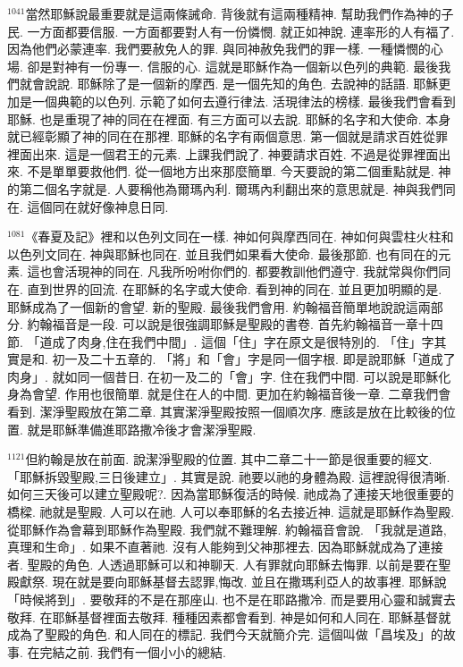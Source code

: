 \documentclass{book}
\begin{document}
$^{1041}$當然耶穌說最重要就是這兩條誡命.
背後就有這兩種精神.
幫助我們作為神的子民.
一方面都要信服.
一方面都要對人有一份憐憫.
就正如神說.
連率形的人有福了.
因為他們必蒙連率.
我們要赦免人的罪.
與同神赦免我們的罪一樣.
一種憐憫的心場.
卻是對神有一份專一.
信服的心.
這就是耶穌作為一個新以色列的典範.
最後我們就會說說.
耶穌除了是一個新的摩西.
是一個先知的角色.
去說神的話語.
耶穌更加是一個典範的以色列.
示範了如何去遵行律法.
活現律法的榜樣.
最後我們會看到耶穌.
也是重現了神的同在在裡面.
有三方面可以去說.
耶穌的名字和大使命.
本身就已經彰顯了神的同在在那裡.
耶穌的名字有兩個意思.
第一個就是請求百姓從罪裡面出來.
這是一個君王的元素.
上課我們說了.
神要請求百姓.
不過是從罪裡面出來.
不是單單要救他們.
從一個地方出來那麼簡單.
今天要說的第二個重點就是.
神的第二個名字就是.
人要稱他為爾瑪內利.
爾瑪內利翻出來的意思就是.
神與我們同在.
這個同在就好像神息日同.

$^{1081}$《春夏及記》裡和以色列文同在一樣.
神如何與摩西同在.
神如何與雲柱火柱和以色列文同在.
神與耶穌也同在.
並且我們如果看大使命.
最後那節.
也有同在的元素.
這也會活現神的同在.
凡我所吩咐你們的.
都要教訓他們遵守.
我就常與你們同在.
直到世界的回流.
在耶穌的名字或大使命.
看到神的同在.
並且更加明顯的是.
耶穌成為了一個新的會望.
新的聖殿.
最後我們會用.
約翰福音簡單地說說這兩部分.
約翰福音是一段.
可以說是很強調耶穌是聖殿的書卷.
首先約翰福音一章十四節.
「道成了肉身,住在我們中間」.
這個「住」字在原文是很特別的.
「住」字其實是和.
初一及二十五章的.
「將」和「會」字是同一個字根.
即是說耶穌「道成了肉身」.
就如同一個昔日.
在初一及二的「會」字.
住在我們中間.
可以說是耶穌化身為會望.
作用也很簡單.
就是住在人的中間.
更加在約翰福音後一章.
二章我們會看到.
潔淨聖殿放在第二章.
其實潔淨聖殿按照一個順次序.
應該是放在比較後的位置.
就是耶穌準備進耶路撒冷後才會潔淨聖殿.

$^{1121}$但約翰是放在前面.
說潔淨聖殿的位置.
其中二章二十一節是很重要的經文.
「耶穌拆毀聖殿,三日後建立」.
其實是說.
祂要以祂的身體為殿.
這裡說得很清晰.
如何三天後可以建立聖殿呢?.
因為當耶穌復活的時候.
祂成為了連接天地很重要的橋樑.
祂就是聖殿.
人可以在祂.
人可以奉耶穌的名去接近神.
這就是耶穌作為聖殿.
從耶穌作為會幕到耶穌作為聖殿.
我們就不難理解.
約翰福音會說.
「我就是道路,真理和生命」.
如果不直著祂.
沒有人能夠到父神那裡去.
因為耶穌就成為了連接者.
聖殿的角色.
人透過耶穌可以和神聊天.
人有罪就向耶穌去悔罪.
以前是要在聖殿獻祭.
現在就是要向耶穌基督去認罪,悔改.
並且在撒瑪利亞人的故事裡.
耶穌說「時候將到」.
要敬拜的不是在那座山.
也不是在耶路撒冷.
而是要用心靈和誠實去敬拜.
在耶穌基督裡面去敬拜.
種種因素都會看到.
神是如何和人同在.
耶穌基督就成為了聖殿的角色.
和人同在的標記.
我們今天就簡介完.
這個叫做「昌埃及」的故事.
在完結之前.
我們有一個小小的總結.
\end{document}
